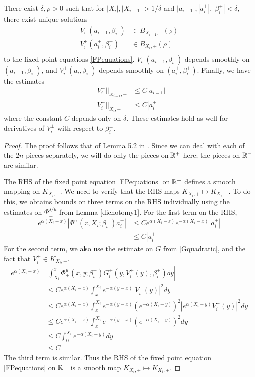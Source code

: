 \documentclass[thesis.tex]{subfiles}
\begin{document}
\begin{lemma}\label{solveforV}
There exist $\delta, \rho > 0$ such that for $|X_i|, |X_{i-1}| > 1/\delta$ and $|a_{i-1}^-|, |a_i^+|, |\beta_i^\pm| < \delta$, there exist unique solutions
\begin{align*}
V_i^-(a_{i-1}^-, \beta_i^-) &\in B_{X_{i-1}, -}(\rho) \\
V_i^+(a_i^+, \beta_i^+) &\in B_{X_i, +}(\rho) \\
\end{align*}
to the fixed point equations \eqref{FPequations}. $V_i^-(a_{i-1}, \beta_i^-)$ depends smoothly on $(a_{i-1}^-, \beta_i^-)$, and $V_i^+(a_i, \beta_i^+)$ depends smoothly on $(a_i^+, \beta_i^+)$. Finally, we have the estimates
\begin{equation}\label{Vest}
\begin{aligned}
||V_i^-||_{X_{i-1}, -} &\leq C |a_{i-1}^-| \\
||V_i^+||_{X_i, +} &\leq C |a_i^+|
\end{aligned}
\end{equation}
where the constant $C$ depends only on $\delta$. These estimates hold as well for derivatives of $V_i^\pm$ with respect to $\beta_i^\pm$.
\begin{proof}
The proof follows that of Lemma 5.2 in \cite{Sandstede1997}. Since we can deal with each of the $2n$ pieces separately, we will do only the pieces on ${\mathbb R}^+$ here; the pieces on ${\mathbb R}^-$ are similar.

The RHS of the fixed point equation \eqref{FPequations} on ${\mathbb R}^+$ defines a smooth mapping on $K_{X_i, +}$. We need to verify that the RHS maps $K_{X_i, +} \mapsto K_{X_i, +}$. To do this, we obtains bounds on three terms on the RHS individually using the estimates on $\Phi^{s/u}_\pm$ from Lemma \ref{dichotomy1}. For the first term on the RHS,
\begin{align*}
e^{\alpha(X_i - x)} | \Phi^u_+(x, X_i; \beta_i^+) a_i^+ | 
&\leq C e^{\alpha(X_i - x)} e^{-\alpha(X_i - x)} |a_i^+| \\
&\leq C |a_i^+|
\end{align*}
For the second term, we also use the estimate on $G$ from \eqref{Gquadratic}, and the fact that $V_i^+ \in K_{X_i, +}$. 
\begin{align*}
e^{\alpha(X_i - x)} &\left| \int_{X_i}^x \Phi_+^u(x, y; \beta_i^+) G_i^+(y, V_i^+(y),\beta_i^+)dy  \right| \\
&\leq C e^{\alpha(X_i - x)} \int_x^{X_i} e^{-\alpha(y - x)}|V_i^+(y)|^2 dy \\
&\leq C e^{\alpha(X_i - x)} \int_x^{X_i} 
e^{-\alpha(y - x)}(e^{-\alpha(X_i - y)})^2|e^{\alpha(X_i - y)} V_i^+(y)|^2 dy \\
&\leq C e^{\alpha(X_i - x)} \int_x^{X_i} 
e^{-\alpha(y - x)}(e^{-\alpha(X_i - y)})^2 dy \\
&\leq C \int_0^{X_i} e^{-\alpha (X_i - y)} dy \\
&\leq C
\end{align*}
The third term is similar. Thus the RHS of the fixed point equation \eqref{FPequations} on ${\mathbb R}^+$ is a smooth map $K_{X_i, +} \mapsto K_{X_i, +}$. 


\end{proof}
\end{lemma}
\end{document}
